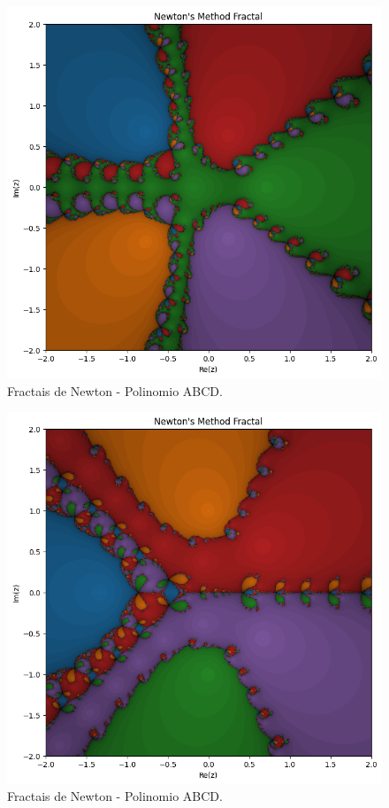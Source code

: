 \begin{figure}[H]
    \centering
    \includegraphics[width=1\textwidth]{Imagens/nr2d_fractals/polinomials/nrfractal_polinomio.png}
    \caption{Fractais de Newton - Polinomio ABCD.}
    \label{fig:fractaisnr_polinomials1}
\end{figure}

\begin{figure}[H]
    \centering
    \includegraphics[width=1\textwidth]{Imagens/nr2d_fractals/polinomials/nrfractal_polinomio2.png}
    \caption{Fractais de Newton - Polinomio ABCD.}
    \label{fig:fractaisnr_polinomials1}
\end{figure}

